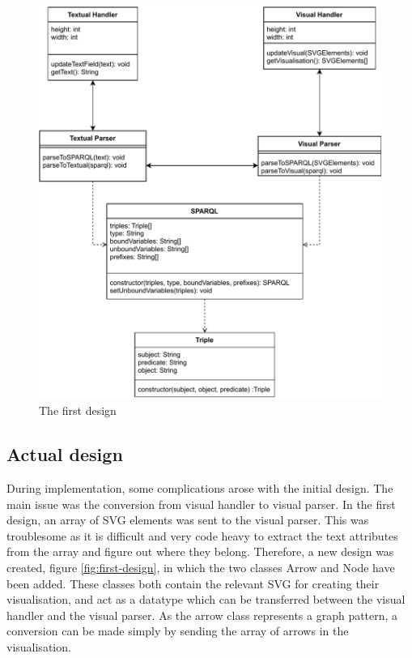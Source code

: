\begin{figure}[H]
    \centering
    \includegraphics[width=1\textwidth]{figures/initial_design.pdf}
    \caption{The first design}
    \label{fig:initial-design}
\end{figure}

\subsection{Actual design}
During implementation, some complications arose with the initial design. The main issue was the conversion from visual handler to visual parser. In the first design, an array of SVG elements was sent to the visual parser. This was troublesome as it is difficult and very code heavy to extract the text attributes from the array and figure out where they belong. Therefore, a new design was created, figure \ref{fig:first-design}, in which the two classes Arrow and Node have been added. These classes both contain the relevant SVG for creating their visualisation, and act as a datatype which can be transferred between the visual handler and the visual parser. As the arrow class represents a graph pattern, a conversion can be made simply by sending the array of arrows in the visualisation.

